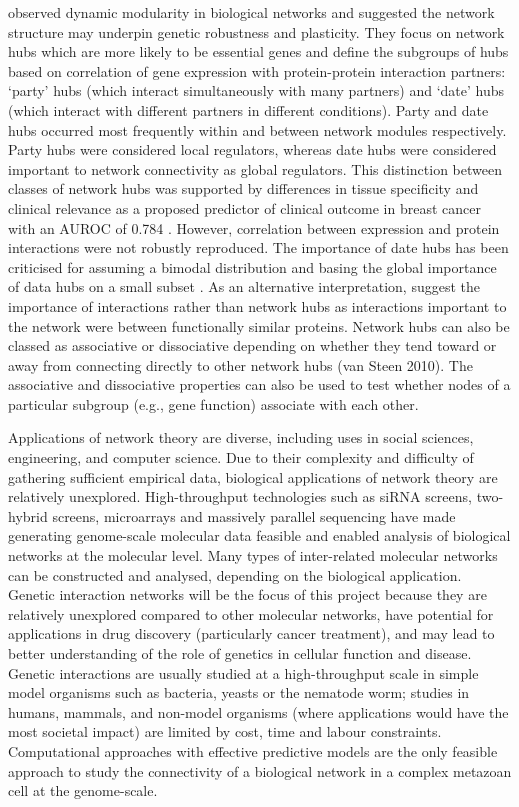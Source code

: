 \citet{Han2004} observed dynamic modularity in biological networks and suggested the network structure may underpin genetic robustness and plasticity. They focus on network hubs which are more likely to be essential genes and define the subgroups of hubs based on correlation of gene expression with protein-protein interaction partners: `party' hubs (which interact simultaneously with many partners) and `date' hubs (which interact with different partners in different conditions). Party and date hubs occurred most frequently within and between network modules respectively. Party hubs were considered local regulators, whereas date hubs were considered important to network connectivity as global regulators. This distinction between classes of network hubs was supported by differences in tissue specificity and clinical relevance as a proposed predictor of clinical outcome in breast cancer with an AUROC of 0.784 \citet{Taylor2009}. However, correlation between expression and protein interactions were not robustly reproduced. The importance of date hubs has been criticised for assuming a bimodal distribution and basing the global importance of data hubs on a small subset \citet{Agarwal2010}. As an alternative interpretation, \citep{Agarwal2010} suggest the importance of interactions rather than network hubs as interactions important to the network were between functionally similar proteins. Network hubs can also be classed as associative or dissociative depending on whether they tend toward or away from connecting directly to other network hubs (van Steen 2010). The associative and dissociative properties can also be used to test whether nodes of a particular subgroup (e.g., gene function) associate with each other. 

Applications of network theory are diverse, including uses in social sciences, engineering, and computer science. Due to their complexity and difficulty of gathering sufficient empirical data, biological applications of network theory are relatively unexplored. High-throughput technologies such as siRNA screens, two-hybrid screens, microarrays and massively parallel sequencing have made generating genome-scale molecular data feasible and enabled analysis of biological networks at the molecular level. Many types of inter-related molecular networks can be constructed and analysed, depending on the biological application. Genetic interaction networks will be the focus of this project because they are relatively unexplored compared to other molecular networks, have potential for applications in drug discovery (particularly cancer treatment), and may lead to better understanding of the role of genetics in cellular function and disease. Genetic interactions are usually studied at a high-throughput scale in simple model organisms such as bacteria, yeasts or the nematode worm; studies in humans, mammals, and non-model organisms (where applications would have the most societal impact) are limited by cost, time and labour constraints. Computational approaches with effective predictive models are the only feasible approach to study the connectivity of a biological network in a complex metazoan cell at the genome-scale.


